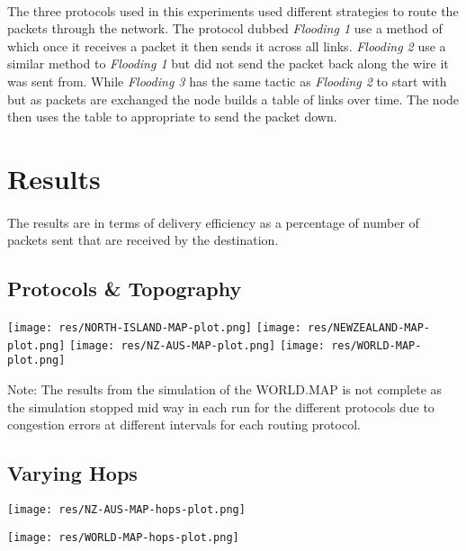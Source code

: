 \documentclass[11pt]{article}
\begin{document}
\paragraph{}
The three protocols used in this experiments used different strategies to
route the packets through the network. The protocol dubbed \emph{Flooding 1}
use a method of which once it receives a packet it then sends it across all
links. \emph{Flooding 2} use a similar method to \emph{Flooding 1} but
did not send the packet back along the wire it was sent from. While
\emph{Flooding 3} has the same tactic as \emph{Flooding 2} to start with
but as packets are exchanged the node builds a table of links over time.
The node then uses the table to appropriate to send the packet down.


\section{Results}\label{results}

\paragraph{}
The results are in terms of delivery efficiency as a percentage of number of
packets sent that are received by the destination.

\subsection{Protocols \& Topography}\label{}

\texttt{[image: res/NORTH-ISLAND-MAP-plot.png]}
\texttt{[image: res/NEWZEALAND-MAP-plot.png]}
\texttt{[image: res/NZ-AUS-MAP-plot.png]}
\texttt{[image: res/WORLD-MAP-plot.png]}

Note: The results from the simulation of the WORLD.MAP is not complete as the
simulation stopped mid way in each run for the different protocols due to congestion
errors at different intervals for each routing protocol.

\subsection{Varying Hops}\label{hops}

\texttt{[image: res/NZ-AUS-MAP-hops-plot.png]}

\texttt{[image: res/WORLD-MAP-hops-plot.png]}
\end{document}
